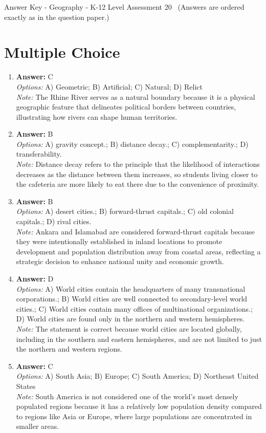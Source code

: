 \documentclass[12pt]{article}
\begin{document}
\begin{center}
Answer Key - Geography - K-12 Level Assessment 20 \
\small (Answers are ordered exactly as in the question paper.)
\end{center}

\section*{Multiple Choice}
\begin{enumerate}[label=\arabic*.]
\item \textbf{Answer:} C
\\ \textit{Options:} A) Geometric; B) Artificial; C) Natural; D) Relict
\\ \textit{Note:} The Rhine River serves as a natural boundary because it is a physical geographic feature that delineates political borders between countries, illustrating how rivers can shape human territories.
\item \textbf{Answer:} B
\\ \textit{Options:} A) gravity concept.; B) distance decay.; C) complementarity.; D) transferability.
\\ \textit{Note:} Distance decay refers to the principle that the likelihood of interactions decreases as the distance between them increases, so students living closer to the cafeteria are more likely to eat there due to the convenience of proximity.
\item \textbf{Answer:} B
\\ \textit{Options:} A) desert cities.; B) forward-thrust capitals.; C) old colonial capitals.; D) rival cities.
\\ \textit{Note:} Ankara and Islamabad are considered forward-thrust capitals because they were intentionally established in inland locations to promote development and population distribution away from coastal areas, reflecting a strategic decision to enhance national unity and economic growth.
\item \textbf{Answer:} D
\\ \textit{Options:} A) World cities contain the headquarters of many transnational corporations.; B) World cities are well connected to secondary-level world cities.; C) World cities contain many offices of multinational organizations.; D) World cities are found only in the northern and western hemispheres.
\\ \textit{Note:} The statement is correct because world cities are located globally, including in the southern and eastern hemispheres, and are not limited to just the northern and western regions.
\item \textbf{Answer:} C
\\ \textit{Options:} A) South Asia; B) Europe; C) South America; D) Northeast United States
\\ \textit{Note:} South America is not considered one of the world's most densely populated regions because it has a relatively low population density compared to regions like Asia or Europe, where large populations are concentrated in smaller areas.
\end{enumerate}
\end{document}

